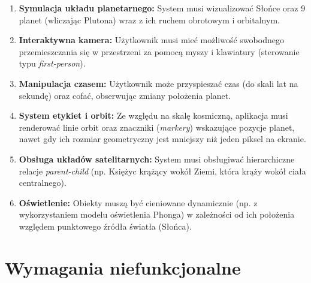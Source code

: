     \begin{enumerate}
        \item \textbf{Symulacja układu planetarnego:} System musi wizualizować Słońce oraz 9 planet (wliczając Plutona) wraz z ich ruchem obrotowym i orbitalnym.
        \item \textbf{Interaktywna kamera:} Użytkownik musi mieć możliwość swobodnego przemieszczania się w przestrzeni za pomocą myszy i klawiatury (sterowanie typu \textit{first-person}).
        \item \textbf{Manipulacja czasem:} Użytkownik może przyspieszać czas (do skali lat na sekundę) oraz cofać, obserwując zmiany położenia planet.
        \item \textbf{System etykiet i orbit:} Ze względu na skalę kosmiczną, aplikacja musi renderować linie orbit oraz znaczniki (\textit{markery}) wskazujące pozycje planet, nawet gdy ich rozmiar geometryczny jest mniejszy niż jeden piksel na ekranie.
        \item \textbf{Obsługa układów satelitarnych:} System musi obsługiwać hierarchiczne relacje \textit{parent-child} (np. Księżyc krążący wokół Ziemi, która krąży wokół ciała centralnego).
        \item \textbf{Oświetlenie:} Obiekty muszą być cieniowane dynamicznie (np. z wykorzystaniem modelu oświetlenia Phonga) w zależności od ich położenia względem punktowego źródła światła (Słońca).
    \end{enumerate}

    \section{Wymagania niefunkcjonalne}


